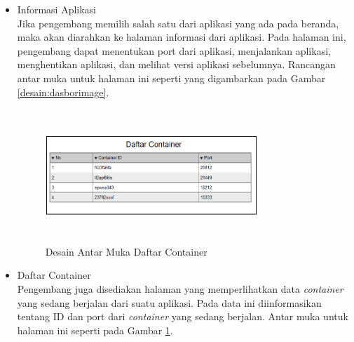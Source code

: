\begin{itemize}
            \item Informasi Aplikasi \\
            	Jika pengembang memilih salah satu dari aplikasi yang ada pada beranda, maka akan diarahkan ke halaman informasi dari aplikasi. Pada halaman ini, pengembang dapat menentukan port dari aplikasi, menjalankan aplikasi, menghentikan aplikasi, dan melihat versi aplikasi sebelumnya. Rancangan antar muka untuk halaman ini seperti yang digambarkan pada Gambar \ref{desain:dasborimage}.
            \begin{figure}[H]
				\centering
				\includegraphics[width=8cm,height=5cm]{Images/C-3/container.png}
				\caption{Desain Antar Muka Daftar Container}
				\label{desain:dasborcontainer}
			\end{figure}
        
            \item Daftar Container \\
            	Pengembang juga disediakan halaman yang memperlihatkan data \textit{container} yang sedang berjalan dari suatu aplikasi. Pada data ini diinformasikan tentang ID dan port dari \textit{container} yang sedang berjalan. Antar muka untuk halaman ini seperti pada Gambar \ref{desain:dasborcontainer}.
            

\end{itemize}
